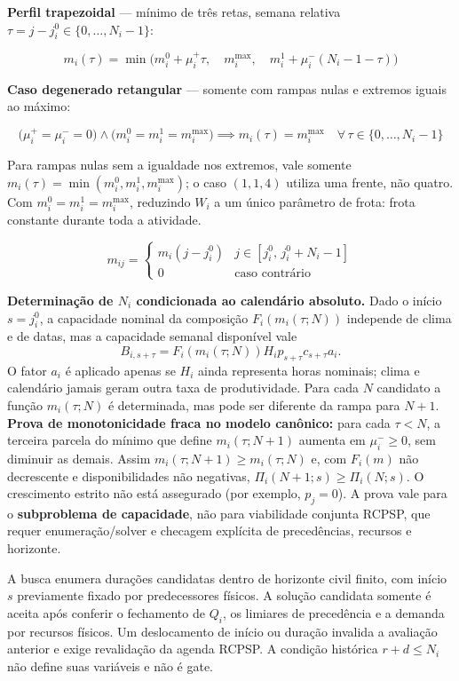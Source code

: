 \documentclass[
  10pt,
]{article}
\begin{document}
\textbf{Perfil trapezoidal} --- mínimo de três retas, semana relativa
\(\tau = j - j_i^0 \in \{0,\ldots,N_i-1\}\):

\[\boxed{m_i(\tau) = \min\!\Big(m_i^0 + \mu_i^+\tau,\quad m_i^{\max},\quad m_i^1 + \mu_i^-(N_i-1-\tau)\Big)}\]

\textbf{Caso degenerado retangular} --- somente com rampas nulas e extremos iguais ao máximo:

\[\bigl(\mu_i^+=\mu_i^-=0\bigr)\land\bigl(m_i^0=m_i^1=m_i^{\max}\bigr)\implies m_i(\tau)=m_i^{\max}\quad\forall\,\tau\in\{0,\ldots,N_i-1\}\]

Para rampas nulas sem a igualdade nos extremos, vale somente \(m_i(\tau)=\min(m_i^0,m_i^1,m_i^{\max})\); o caso \((1,1,4)\) utiliza uma frente, não quatro. Com \(m_i^0=m_i^1=m_i^{\max}\), reduzindo \(W_i\) a um único
parâmetro de frota: frota constante durante toda a atividade.

\[m_{ij} = \begin{cases} m_i(j-j_i^0) & j\in[j_i^0,\,j_i^0+N_i-1] \\ 0 & \text{caso contrário}\end{cases}\]

\textbf{Determinação de \(N_i\) condicionada ao calendário absoluto.}
Dado o início \(s=j_i^0\), a capacidade nominal da composição
\(F_i(m_i(\tau;N))\) independe de clima e de datas, mas a capacidade
semanal disponível vale
\[
 B_{i,s+\tau}=F_i(m_i(\tau;N))H_i p_{s+\tau}c_{s+\tau}a_i.
\]
O fator \(a_i\) é aplicado apenas se \(H_i\) ainda representa horas
nominais; clima e calendário jamais geram outra taxa de produtividade.
Para cada \(N\) candidato a função \(m_i(\tau;N)\) é determinada,
mas pode ser diferente da rampa para \(N+1\).
\textbf{Prova de monotonicidade fraca no modelo canônico:}
para cada \(\tau<N\), a terceira parcela do mínimo que define
\(m_i(\tau;N+1)\) aumenta em \(\mu_i^-\ge0\), sem diminuir
as demais. Assim \(m_i(\tau;N+1)\ge m_i(\tau;N)\) e,
com \(F_i(m)\) não decrescente e disponibilidades não
negativas, \(\Pi_i(N+1;s)\ge\Pi_i(N;s)\).
O crescimento estrito não está assegurado (por exemplo,
\(p_j=0\)). A prova vale para o \textbf{subproblema de capacidade},
não para viabilidade conjunta RCPSP, que requer enumeração/solver
e checagem explícita de precedências, recursos e horizonte.

A busca enumera durações candidatas dentro de horizonte civil finito,
com início \(s\) previamente fixado por predecessores físicos. A
solução candidata somente é aceita após conferir o fechamento de
\(Q_i\), os limiares de precedência e a demanda por recursos físicos.
Um deslocamento de início ou duração invalida a avaliação anterior
e exige revalidação da agenda RCPSP. A condição histórica
\(r+d\le N_i\) não define suas variáveis e não é gate.
\end{document}
